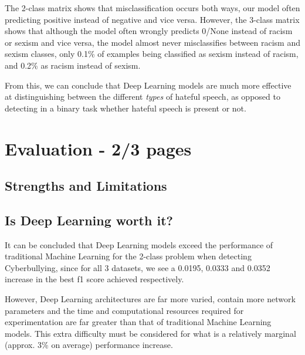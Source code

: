 \documentclass[12pt,a4paper]{article}
\begin{document}
The 2-class matrix shows that misclassification occurs both ways, our model often predicting positive instead of negative and vice versa. However, the 3-class matrix shows that although the model often wrongly predicts 0/None instead of racism or sexism and vice versa, the model almost never misclassifies between racism and sexism classes, only 0.1\% of examples being classified as sexism instead of racism, and 0.2\% as racism instead of sexism.

From this, we can conclude that Deep Learning models are much more effective at distinguishing between the different \textit{types} of hateful speech, as opposed to detecting in a binary task whether hateful speech is present or not.




\section{Evaluation - 2/3 pages}

\subsection{Strengths and Limitations}

\subsection{Is Deep Learning worth it?}
It can be concluded that Deep Learning models exceed the performance of traditional Machine Learning for the 2-class problem when detecting Cyberbullying, since for all 3 datasets, we see a 0.0195, 0.0333 and 0.0352 increase in the best f1 score achieved respectively.

However, Deep Learning architectures are far more varied, contain more network parameters and the time and computational resources required for experimentation are far greater than that of traditional Machine Learning models. This extra difficulty must be considered for what is a relatively marginal (approx. 3\% on average) performance increase.
\end{document}
